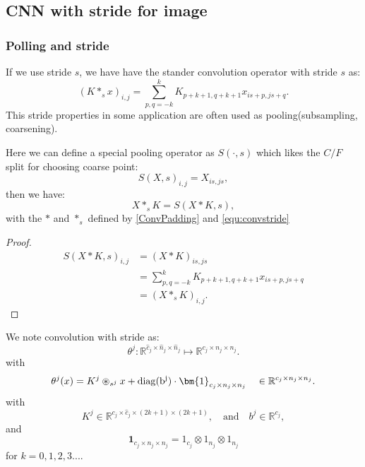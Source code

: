 \subsection{CNN with stride for image}
\subsubsection{Polling and stride}
If we use stride $s$, we have have the stander convolution operator with stride $s$ as:
\begin{equation}\label{equ:convstride}
(K\ast_{s} x)_{i,j} = \sum_{p, q = -k}^k K_{p+k+1,q+k+1}x_{is + p, js + q} .
\end{equation}
This stride properties in some application are often used as pooling(subsampling, coarsening).

Here we can define a special pooling operator as $S(\cdot,s)$ which likes the $C/F$ split for choosing coarse point:
\begin{equation}
S(X,s)_{i,j} = X_{is, js },
\end{equation}
then we have:
\begin{equation}\label{equ:stride}
X \ast_s K = S(X\ast K, s),
\end{equation}
with the $\ast$ and $\ast_s$ defined by \eqref{ConvPadding} and \eqref{equ:convstride}
\begin{proof}
\begin{align}
S(X \ast K,s)_{i,j} &= (X \ast K)_{is, js}  \\
&= \sum_{p, q = -k}^k K_{p+k+1,q+k+1}x_{is + p, js + q}  \\
&= (X \ast_s K)_{i,j}.
\end{align}
\end{proof}


We note convolution with stride as:
\begin{equation}
\theta^j: \mathbb R^{\hat c_j \times \hat{n}_{j} \times \hat n_{j} } \mapsto \mathbb{R}^{c_j \times n_{j} \times n_j }.
\end{equation}
with
\begin{equation}
\theta^j(x) = K^j \circledast_{s^j} x + {\rm{diag}(b^j)} \cdot \bm{1}_{c_j \times n_j \times n_j} \quad
\in\mathbb R^{c_j\times n_j\times n_j}.
\end{equation}
with
	\begin{equation}
	K^j \in \mathbb{R}^{ c_{j} \times \hat c_{j} \times (2k+1) \times (2k+1)},  \quad \text{and} \quad b^j \in \mathbb{R}^{c_j},
	\end{equation}
	and
	\begin{equation}
	\bm{1}_{c_j \times n_j \times n_j} = 1_{c_{j}} \otimes 1_{n_j} \otimes 1_{n_j}
	\end{equation}
for $k = 0, 1, 2, 3...$.


